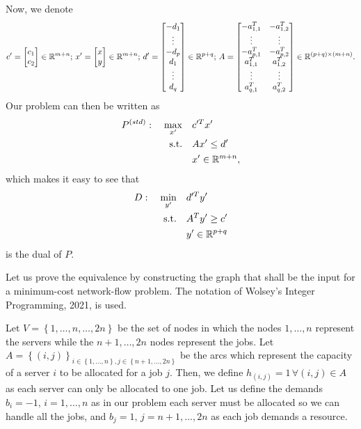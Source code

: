 \documentclass[a4paper]{report}
\begin{document}
Now, we denote \[
c' = \begin{bmatrix} c_1 \\ c_2 \end{bmatrix} \in \mathbb{R}^{m+n};\,
x' = \begin{bmatrix} x \\ y \end{bmatrix} \in \mathbb{R}^{m+n};\,
d' = \begin{bmatrix} -d_1 \\ \vdots \\ -d_p \\ d_1 \\ \vdots \\ d_q \end{bmatrix} \in \mathbb{R}^{p+q};\,
A = \begin{bmatrix}
    -a_{1,1}^{T} & -a_{1,2}^{T} \\
    \vdots & \vdots \\
    -a_{p,1}^{T} & -a_{p,2}^{T} \\
    a_{1,1}^{T} & a_{1,2}^{T} \\
    \vdots & \vdots \\
    a_{q,1}^{T} & a_{q,2}^{T} \\
\end{bmatrix} \in \mathbb{R}^{\left( p+q \right)  \times \left( m+n \right) }
.\] Our problem can then be written as
\begin{align*}
    P^{(std)}:\quad \max_{x'} \quad & c'^{T}x' \\
    \textrm{s.t.} \quad & A x' \le d' \\
			& x'\in \mathbb{R}^{m+n}
,\end{align*}
which makes it easy to see that
\begin{align*}
    D:\quad \min_{y'} \quad & d'^{T}y' \\
    \textrm{s.t.} \quad & A^{T}y' \ge c' \\
      & y'\in \mathbb{R}^{p+q}
\end{align*}
is the dual of $P$.


Let us prove the equivalence by constructing the graph that shall be the input for a minimum-cost network-flow problem. The notation of Wolsey's Integer Programming, 2021, is used.

Let $V=\left\{ 1,\ldots,n,\ldots, 2n \right\} $	be the set of nodes in which the nodes $1,\ldots,n$ represent the servers while the $n+1,\ldots,2n$ nodes represent the jobs. Let $A=\left\{ \left( i,j \right)  \right\}_{i\in \left\{ 1,\ldots,n \right\},j\in \left\{ n+1,\ldots,2n \right\} }$ be the arcs which represent the capacity of a server $i$ to be allocated for a job $j$. Then, we define $h_{\left( i,j \right) } = 1\,\forall \left( i,j \right) \in A$ as each server can only be allocated to one job. Let us define the demands $b_i = -1,\,i=1,\ldots,n$ as in our problem each server must be allocated so we can handle all the jobs, and $b_j=1,\,j=n+1,\ldots,2n$ as each job demands a resource.
\end{document}
